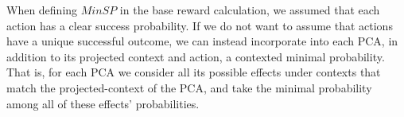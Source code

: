 \documentclass[letterpaper]{article} %
\theoremstyle{definition}
\newcommand{\eliran}[1]{\textbf{[\color{red}ELIRAN:#1]}}
\newcommand{\ronen}[1]{\textbf{[\color{blue}RONEN:#1]}}
\newcommand{\guy}[1]{\textbf{[\color{orange}GUY:#1]}}
\begin{document}

When defining $MinSP$ in the base reward calculation, we assumed that each action has a clear success probability. If we do not want to assume that actions have a unique successful outcome, we can instead incorporate into each PCA, in addition to its projected context and action, a contexted minimal probability. That is, for each PCA we consider all its possible effects under contexts that match the projected-context of the PCA, and take the minimal probability among all of these effects' probabilities.
\end{document}
